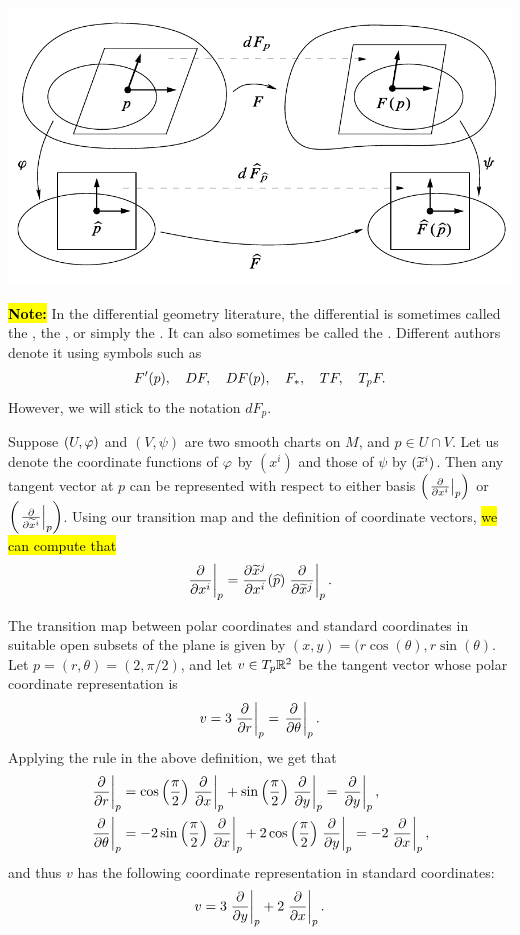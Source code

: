 \begin{center}
\includegraphics[scale = 0.5]{chapter03/c3f6.png}
\end{center}

\hl{\textbf{Note:}} In the differential geometry literature, the differential is sometimes called the , the , or simply the . It can also sometimes be called the . Different authors denote it using symbols such as
\[F^\prime(p),\quad DF,\quad DF(p),\quad F_*,\quad TF, \quad T_pF.\]
However, we will stick to the notation $dF_p$.

\dfn Suppose $(U,\varphi)$ and $(V,\psi)$ are two smooth charts on $M$, and $p\in U\cap V$. Let us denote the coordinate functions of $\varphi$ by $(x^i)$ and those of $\psi$ by $(\widetilde x^i)$. Then any tangent vector at $p$ can be represented with respect to either basis $\left(\left. \frac{\partial}{\partial x^i}\right|_{p}\right)$ or $\left(\left. \frac{\partial}{\partial \widetilde x^i}\right|_{p}\right)$. Using our transition map and the definition of coordinate vectors, \hl{we can compute that}
\[\left. \frac{\partial}{\partial x^i}\right|_{p} = \frac{\partial{\widetilde x^j}}{\partial{x^i}}(\widehat p)\left. \frac{\partial}{\partial \widetilde x^j}\right|_{p}.\]

\begin{ex}
The transition map between polar coordinates and standard coordinates in suitable open subsets of the plane is given by $(x,y) = (r\cos(\theta),r\sin(\theta)$. Let $p = (r,\theta) = (2, \pi/2)$, and let $v\in T_p\mathbb{R}^2$ be the tangent vector whose polar coordinate representation is
\[v = 3\left. \frac{\partial}{\partial r}\right|_{p} = \left. \frac{\partial}{\partial \theta}\right|_{p}.\]
Applying the rule in the above definition, we get that
\begin{align*}
    \left. \frac{\partial}{\partial r}\right|_{p} &= \cos\left(\frac{\pi}{2}\right)\left. \frac{\partial}{\partial x}\right|_{p} + \sin\left(\frac{\pi}{2}\right)\left. \frac{\partial}{\partial y}\right|_{p} = \left. \frac{\partial}{\partial y}\right|_{p},\\
    \left. \frac{\partial}{\partial \theta}\right|_{p} &=
    -2\sin\left(\frac{\pi}{2}\right)\left. \frac{\partial}{\partial x}\right|_{p} + 2\cos\left(\frac{\pi}{2}\right)\left. \frac{\partial}{\partial y}\right|_{p} = -2\left. \frac{\partial}{\partial x}\right|_{p},
\end{align*}
and thus $v$ has the following coordinate representation in standard coordinates:
\[v = 3\left. \frac{\partial}{\partial y}\right|_{p} + 2\left. \frac{\partial}{\partial x}\right|_{p}.\]
\end{ex}


